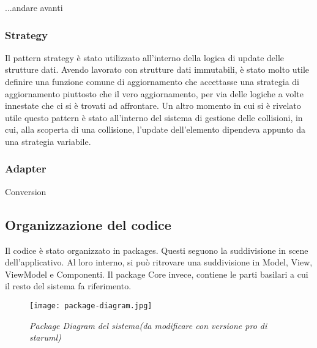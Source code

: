 ...andare avanti

\subsubsection{Strategy}
Il pattern strategy è stato utilizzato all'interno della logica di update delle strutture dati. Avendo lavorato con strutture dati immutabili, è stato molto utile definire una funzione comune di aggiornamento che accettasse una strategia di aggiornamento piuttosto che il vero aggiornamento, per via delle logiche a volte innestate che ci si è trovati ad affrontare. 
Un altro momento in cui si è rivelato utile questo pattern è stato all'interno del sistema di gestione delle collisioni, in cui, alla scoperta di una collisione, l'update dell'elemento dipendeva appunto da una strategia variabile. 
\subsubsection{Adapter}
Conversion

\subsection{Organizzazione del codice}
Il codice è stato organizzato in packages. Questi seguono la suddivisione in scene dell'applicativo. Al loro interno, si può ritrovare una suddivisione in Model, View, ViewModel e Componenti.
Il package Core invece, contiene le parti basilari a cui il resto del sistema fa riferimento.

\begin{figure}[!hbt]
    \centering
    \texttt{[image: package-diagram.jpg]}
    \caption{\textit{Package Diagram del sistema(da modificare con versione pro di staruml)}} 
\end{figure}